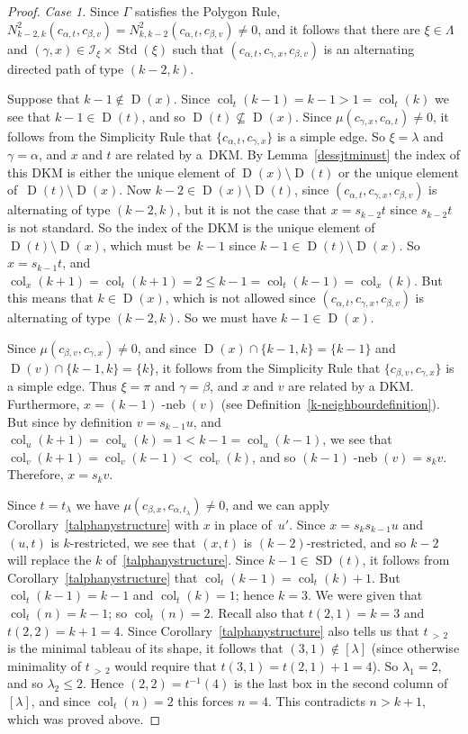 \documentclass[ALCO,ThmDefs,Unicode,epreuves]{cedram}
\newenvironment{Case}[1]{\smallskip\noindent\emph{Case #1}\endgraf
 \nobreak\noindent\ignorespaces}{\endgraf\smallskip}
\DeclareMathOperator{\col}{col}
\newcommand{\morethan}[2]{#1\,{_{>\,#2}}}
\DeclareMathOperator{\STD}{Std}
\DeclareMathOperator{\neb}{-neb}
\DeclareMathOperator{\SD}{SD}
\DeclareMathOperator{\D}{D}
\begin{document}
\begin{proof}
\begin{Case}{1.}
Since $\Gamma$ satisfies the
Polygon Rule,
$N^{2}_{k-2,k}(c_{\alpha,t},c_{\beta,v})=N^{2}_{k,k-2}(c_{\alpha,t},c_{\beta,v})\ne 0$,
and it follows that there are $\xi\in\Lambda$ and $(\gamma,x)\in\mathcal{I}_{\xi}\times\STD(\xi)$
such that $(c_{\alpha,t},c_{\gamma,x},c_{\beta,v})$
is an alternating directed path of type $(k-2,k)$.

Suppose that $k-1\notin\D(x)$. Since $\col_t(k-1)=k-1>1=\col_t(k)$ we see that
$k-1\in\D(t)$, and so $\D(t)\nsubseteq\D(x)$. Since $\mu(c_{\gamma,x},c_{\alpha,t})\ne0$,
it follows from the Simplicity Rule that $\{c_{\alpha,t},c_{\gamma,x}\}$ is a simple edge.
So $\xi=\lambda$ and $\gamma=\alpha$, and $x$ and $t$ are related by a~DKM.
By Lemma~\ref{dessjtminust} the index of this DKM is either the unique element
of $\D(x)\setminus\D(t)$ or the unique element of~$\D(t)\setminus\D(x)$. Now
$k-2\in\D(x)\setminus\D(t)$, since $(c_{\alpha,t},c_{\gamma,x},c_{\beta,v})$ is
alternating of type $(k-2,k)$, but it is not the case that $x=s_{k-2}t$ since
$s_{k-2}t$ is not standard. So the index of the DKM is the unique element of
$\D(t)\setminus\D(x)$, which must be~$k-1$ since $k-1\in\D(t)\setminus\D(x)$.
So $x=s_{k-1}t$,
and $\col_x(k+1)=\col_t(k+1)=2\leq k-1=\col_t(k-1)=\col_x(k)$. But this means that
$k\in\D(x)$, which is not allowed since $(c_{\alpha,t},c_{\gamma,x},c_{\beta,v})$ is
alternating of type $(k-2,k)$. So we must have $k-1\in\D(x)$.

Since $\mu(c_{\beta,v},c_{\gamma,x})\neq 0$, and since
$\D(x)\cap\{k-1,k\}=\{k-1\}$ and $\D(v)\cap\{k-1,k\}=\{k\}$, it follows from
the Simplicity Rule that $\{c_{\beta,v},c_{\gamma,x}\}$ is a
simple edge. Thus $\xi=\pi$ and $\gamma=\beta$, and $x$ and $v$
are related by a DKM. Furthermore, $x=(k-1)\neb(v)$
(see Definition~\ref{k-neighbourdefinition}). But since by definition
$v=s_{k-1}u$, and $\col_u(k+1)=\col_u(k)=1<k-1=\col_u(k-1)$, we see that
$\col_v(k+1)=\col_v(k-1)<\col_v(k)$, and so $(k-1)\neb(v)=s_kv$.
Therefore, $x=s_kv$.

Since $t=t_\lambda$ we have $\mu(c_{\beta,x},c_{\alpha,t_\lambda})\ne0$, and we
can apply Corollary~\ref{talphanystructure} with $x$ in place of~$u'$.
Since $x=s_ks_{k-1}u$ and $(u,t)$ is $k$-restricted, we see that $(x,t)$
is $(k-2)$-restricted, and so $k-2$ will replace the $k$ of~\ref{talphanystructure}.
Since $k-1\in\SD(t)$, it follows from Corollary~\ref{talphanystructure} that
$\col_t(k-1)=\col_t(k)+1$. But $\col_t(k-1)=k-1$ and $\col_t(k)=1$; hence
$k=3$. We were given that $\col_t(n)=k-1$; so $\col_t(n)=2$.
Recall also that $t(2,1)=k=3$ and $t(2,2)=k+1=4$. Since Corollary~\ref{talphanystructure}
also tells us that $\morethan t2$ is the minimal tableau of its shape,
it follows that $(3,1)\notin[\lambda]$ (since otherwise minimality of
$\morethan t2$ would require that $t(3,1)=t(2,1)+1=4$). So $\lambda_1=2$,
and so $\lambda_2\leqslant 2$.
Hence $(2,2)=t^{-1}(4)$ is the last box in the second column of~$[\lambda]$,
and since $\col_t(n)=2$ this forces $n=4$. This contradicts $n>k+1$,
which was proved above.
\end{Case}


\end{proof}
\end{document}
